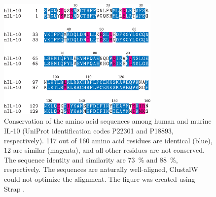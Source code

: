 \begin{figure}
\centering
\includegraphics[width=0.7\textwidth]{gfx/background/murine_human_Il10_alignment_01.pdf}
\caption[]{
Conservation of the amino acid sequences among human and murine IL-10 (UniProt
\cite{TheUniProtConsortium01012014} identification codes P22301 and P18893,
respectively). 117 out of 160 amino acid residues are identical (blue), 12 are
similar (magenta), and all other residues are not conserved. The sequence
identity and similarity are \SI{73}{\percent} and \SI{88}{\percent},
respectively. The sequences are naturally well-aligned, ClustalW
\cite{clustalw_2008} could not optimize the alignment. The figure was created
using Strap \cite{strap_website}.}
\label{fig:bg:murine_human_il10_sequence}
\end{figure}




